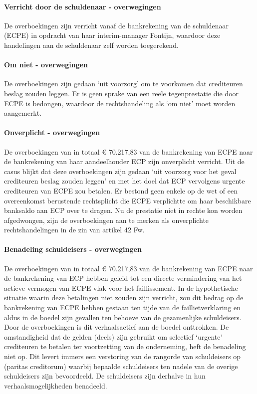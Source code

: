 \documentclass[
  dutch,
  a4paper,
]{article}
\begin{document}
\paragraph{Verricht door de schuldenaar - overwegingen}\label{verricht-door-de-schuldenaar---overwegingen-50}

De overboekingen zijn verricht vanaf de bankrekening van de schuldenaar (ECPE) in opdracht van haar interim-manager Fontijn, waardoor deze handelingen aan de schuldenaar zelf worden toegerekend.

\paragraph{Om niet - overwegingen}\label{om-niet---overwegingen-50}

De overboekingen zijn gedaan `uit voorzorg' om te voorkomen dat crediteuren beslag zouden leggen. Er is geen sprake van een reële tegenprestatie die door ECPE is bedongen, waardoor de rechtshandeling als `om niet' moet worden aangemerkt.

\paragraph{Onverplicht - overwegingen}\label{onverplicht---overwegingen-50}

De overboekingen van in totaal € 70.217,83 van de bankrekening van ECPE naar de bankrekening van haar aandeelhouder ECP zijn onverplicht verricht. Uit de casus blijkt dat deze overboekingen zijn gedaan `uit voorzorg voor het geval crediteuren beslag zouden leggen' en met het doel dat ECP vervolgens urgente crediteuren van ECPE zou betalen. Er bestond geen enkele op de wet of een overeenkomst berustende rechtsplicht die ECPE verplichtte om haar beschikbare banksaldo aan ECP over te dragen. Nu de prestatie niet in rechte kon worden afgedwongen, zijn de overboekingen aan te merken als onverplichte rechtshandelingen in de zin van artikel 42 Fw.

\paragraph{Benadeling schuldeisers - overwegingen}\label{benadeling-schuldeisers---overwegingen-50}

De overboekingen van in totaal € 70.217,83 van de bankrekening van ECPE naar de bankrekening van ECP hebben geleid tot een directe vermindering van het actieve vermogen van ECPE vlak voor het faillissement. In de hypothetische situatie waarin deze betalingen niet zouden zijn verricht, zou dit bedrag op de bankrekening van ECPE hebben gestaan ten tijde van de faillietverklaring en aldus in de boedel zijn gevallen ten behoeve van de gezamenlijke schuldeisers. Door de overboekingen is dit verhaalsactief aan de boedel onttrokken. De omstandigheid dat de gelden (deels) zijn gebruikt om selectief `urgente' crediteuren te betalen ter voortzetting van de onderneming, heft de benadeling niet op. Dit levert immers een verstoring van de rangorde van schuldeisers op (paritas creditorum) waarbij bepaalde schuldeisers ten nadele van de overige schuldeisers zijn bevoordeeld. De schuldeisers zijn derhalve in hun verhaalsmogelijkheden benadeeld.
\end{document}
